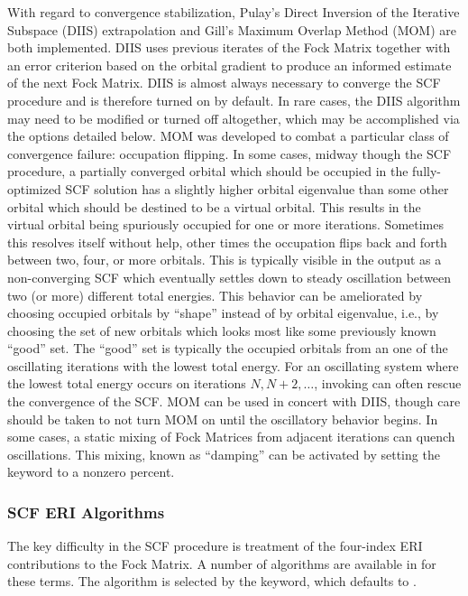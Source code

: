 With regard to convergence stabilization, Pulay's Direct Inversion of the
Iterative Subspace (DIIS) extrapolation and Gill's Maximum Overlap Method (MOM)
are both implemented. DIIS uses previous iterates of the Fock Matrix together
with an error criterion based on the orbital gradient to produce an informed
estimate of the next Fock Matrix. DIIS is almost always necessary to converge
the SCF procedure and is therefore turned on by default. In rare cases, the
DIIS algorithm may need to be modified or turned off altogether, which may be
accomplished via the options detailed below. MOM was developed to combat a
particular class of convergence failure: occupation flipping. In some cases,
midway though the SCF procedure, a partially converged orbital which should be
occupied in the fully-optimized SCF solution has a slightly higher orbital
eigenvalue than some other orbital which should be destined to be a virtual
orbital. This results in the virtual orbital being spuriously occupied for one
or more iterations. Sometimes this resolves itself without help, other times the
occupation flips back and forth between two, four, or more orbitals. This is
typically visible in the output as a non-converging SCF which eventually settles
down to steady oscillation between two (or more) different total energies. This
behavior can be ameliorated by choosing occupied orbitals by ``shape'' instead
of by orbital eigenvalue, i.e., by choosing the set of new orbitals which looks
most like some previously known ``good'' set.  The ``good'' set is typically the
occupied orbitals from an one of the oscillating iterations with the lowest
total energy. For an oscillating system where the lowest total energy occurs on
iterations $N,N+2,\ldots$, invoking   can often rescue the
convergence of the SCF. MOM can be used in concert with DIIS, though care should
be taken to not turn MOM on until the oscillatory behavior begins. In some
cases, a static mixing of Fock Matrices from adjacent iterations can quench
oscillations. This mixing, known as ``damping'' can be activated by setting the
 keyword to a nonzero percent. 

\subsubsection{SCF ERI Algorithms}

The key difficulty in the SCF procedure is treatment of the four-index ERI
contributions to the Fock Matrix. A number of algorithms are available in
\PSIfour for these terms. The algorithm is selected by the 
keyword, which defaults to . 

